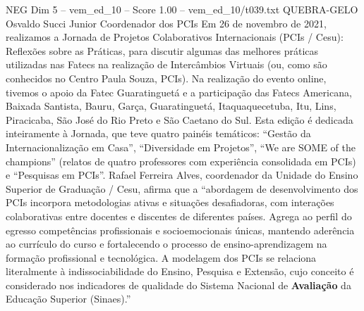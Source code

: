 \begin{textsample}{NEG Dim 5 – vem\_ed\_10 – Score 1.00 – vem\_ed\_10/t039.txt}  \label{ex:f5_neg_037}
QUEBRA-GELO Osvaldo Succi Junior Coordenador dos PCIs Em 26 de novembro de 2021, realizamos a Jornada de Projetos Colaborativos Internacionais (PCIs / Cesu): Reflexões sobre as Práticas, para discutir algumas das melhores práticas utilizadas nas Fatecs na realização de Intercâmbios Virtuais (ou, como são conhecidos no Centro Paula Souza, PCIs).
Na realização do evento online, tivemos o apoio da Fatec Guaratinguetá e a participação das Fatecs Americana, Baixada Santista, Bauru, Garça, Guaratinguetá, Itaquaquecetuba, Itu, Lins, Piracicaba, São José do Rio Preto e São Caetano do Sul.
Esta edição é dedicada inteiramente à Jornada, que teve quatro painéis temáticos: “Gestão da Internacionalização em Casa”, “Diversidade em Projetos”, “We are SOME of the champions” (relatos de quatro professores com experiência consolidada em PCIs) e “Pesquisas em PCIs”.
Rafael Ferreira Alves, coordenador da Unidade do Ensino Superior de Graduação / Cesu, afirma que a “abordagem de desenvolvimento dos PCIs incorpora metodologias ativas e situações desafiadoras, com interações colaborativas entre docentes e discentes de diferentes países.
Agrega ao perfil do egresso competências profissionais e socioemocionais únicas, mantendo aderência ao currículo do curso e fortalecendo o processo de ensino-aprendizagem na formação profissional e tecnológica.
A modelagem dos PCIs se relaciona literalmente à indissociabilidade do Ensino, Pesquisa e Extensão, cujo conceito é considerado nos indicadores de qualidade do Sistema Nacional de \textbf{Avaliação} da Educação Superior (Sinaes).”

\end{textsample}
